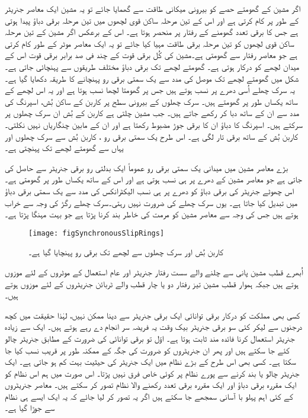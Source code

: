 اگر مشین کے گھومتے حصے کو بیرونی میکانی طاقت سے گھمایا جائے تو یہ مشین ایک معاصر جنریٹر کے طور پر کام کرتی ہے اور اس کے تین مرحلہ ساکن قوی لچھوں میں تین مرحلہ برقی دباؤ پیدا ہوتی ہے جس کا برقی تعدد گھومنے کے رفتار پر منحصر ہوتا ہے۔ اس کے برعکس اگر مشین کے تین  مرحلہ ساکن قوی لچھوں کو تین مرحلہ برقی طاقت مہیا کیا جائے تو یہ ایک معاصر موٹر کے طور کام کرتی ہے جو معاصر رفتار سے گھومتی ہے۔مشین کی کُل برقی قوت کے چند فی صد  برابر برقی قوت اس کے میدان لچھے کو درکار ہوتی ہے۔ گھومتے لچھے تک برقی دباؤ مختلف طریقوں سے پہنچائی جاتی ہے۔شکل   میں گھومتے لچھے تک موصل   کی مدد سے یک سمتی برقی رو پہنچانے کا طریقہ دکھایا گیا ہے۔ یہ سرک چھلے اُسی دھرے  پر نسب ہوتے ہیں جس پر گھومتا لچھا نسب ہوتا ہے اور یہ اس لچھے کے ساتھ یکساں طور پر گھومتے ہیں۔ سرک چھلوں  کے بیرونی سطح پر کاربن کے ساکن بُش، اسپرنگ  کی مدد سے ان کے ساتھ دبا کر رکھے جاتے ہیں۔ جب مشین چلتی ہے  کاربن کے بُش ان سرک چھلوں پر سرکتے ہیں۔ اسپرنگ کا دباؤ ان کا برقی جوڑ مضبوط رکھتا ہے اور ان کے مابین چنگاریاں نہیں نکلتی۔ کاربن بُش کے ساتھ برقی تار لگی ہے۔ اس طرح یک سمتی برقی رو  ، کاربن بُش سے سرک چھلوں اور یہاں سے گھومتے لچھے تک پہنچتی ہے۔

بڑے معاصر مشین میں میدانی یک سمتی برقی رو عموماً ایک بدلتی رو برقی جنریٹر سے حاصل کی جاتی ہے جو معاصر مشین کے دھرے پر ہی نسب ہوتی ہے اور اس کے ساتھ یکساں طور پر گھومتی ہے۔اس چھوٹے جنریٹر کی برقی دباؤ کو دھرے پر ہی نسب الیکٹرانکس کی مدد سے یک سمتی برقی دباؤ میں تبدیل کیا جاتا ہے۔ یوں سرک چھلے کی ضرورت نہیں رہتی۔سرک چھلے رگڑ کی وجہ سے خراب ہوتے ہیں جس کی وجہ سے معاصر مشین کو مرمت کی خاطر بند کرنا پڑتا ہے جو بہت مہنگا پڑتا ہے۔
\begin{figure}
\centering
\texttt{[image: figSynchronousSlipRings]}
\caption{کاربن بُش اور سرک چھلوں سے لچھے تک برقی رو پہنچایا گیا ہے۔}
\label{شکل_معاصر_سرک_چھلے}
\end{figure}

اُبھرے قطب مشین پانی سے چلنے والے سست رفتار جنریٹر اور  عام استعمال کے موٹروں کے لئے موزوں ہوتے ہیں جبکہ ہموار قطب مشین تیز رفتار دو یا چار قطب والے ٹربائن جنریٹروں کے لئے موزوں ہوتے ہیں۔

کسی بھی مملکت کو درکار برقی توانائی ایک برقی جنریٹر سے دینا ممکن نہیں، لہٰذا حقیقت میں کچھ درجنوں سے لیکر کئی سو برقی جنریٹر بیک وقت یہ فریضہ سر انجام دے رہے ہوتے ہیں۔ ایک سے زیادہ جنریٹر استعمال کرنا فائدہ مند ثابت ہوتا ہے۔ اوّل تو برقی توانائی کی ضرورت کے مطابق جنریٹر چالو کئے جا سکتے ہیں اور پھر ان جنریٹروں کو ضرورت کی جگہ کے ممکنہ طور پر قریب نسب کیا جا سکتا ہے۔ کسی بھی اس طرح کے بڑے نظام میں ایک جنریٹر کی حیثیت بہت کم ہو جاتی ہے۔ ایک جنریٹر چالو یا بند کرنے سے پورے نظام پر کوئی خاص فرق نہیں پڑتا۔ اس صورت میں ہم اس نظام کو ایک مقررہ برقی دباؤ اور ایک مقررہ برقی تعدد رکھنے والا نظام تصور کر سکتے ہیں۔ معاصر جنریٹروں کے کئی اہم پہلو با آسانی سمجھے جا سکتے ہیں اگر یہ تصور کر لیا جائے کہ یہ ایک ایسے ہی نظام سے جوڑا گیا ہے۔


